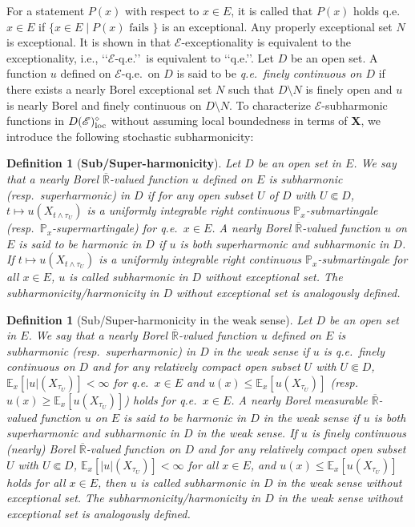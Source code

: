 \documentclass[12pt,a4paper]{article}
\newtheorem{defn}[thm]{Definition}
\newcommand{\R}{\mathbb{R}}
\newcommand{\loc}{{\rm loc}}
\newcommand{\1}{{\bf 1}}
\begin{document}
For a statement $P(x)$ with respect to $x\in E$, it is called that $P(x)$ holds q.e.~$x\in E$ if $\{x\in E\mid P(x)\text{ fails }\}$ is an exceptional. 
Any properly exceptional set $N$ is exceptional. 
It is shown in \cite[Chapter IV, Theorem~5.29(i)]{MR} that $\mathscr{E}$-exceptionality is 
equivalent to the exceptionality, i.e., \lq\lq$\mathscr{E}$-q.e.\rq\rq\, is 
equivalent to \lq\lq q.e.\rq\rq.  Let $D$ be an open set.           
A function $u$ defined on $\mathscr{E}$-q.e.~on $D$ is said to be {\it q.e.~finely continuous on $D$} if there exists a nearly Borel exceptional set 
$N$ such that $D\setminus N$ is finely open and $u$ is nearly Borel and finely continuous on $D\setminus N$.   
To characterize $\mathscr{E}$-subharmonic functions in $D(\mathscr{E})_{\loc}^{\diamond}$ without assuming local boundedness in terms of {\bf X}, we introduce 
the following stochastic subharmonicity: 
\begin{defn}[{{\bf Sub/Super-harmonicity}}]
\label{df:stochasticsubharmonicity}
{\rm Let $D$ be an open set in $E$. We say that a nearly Borel
$\overline{\R}$-valued function $u$ defined on $E$ is
\emph{subharmonic {\rm(}resp.~superharmonic{\rm)} in $D$} if 
for any open subset $U$ of $D$ with $U\Subset D$, $t\mapsto u(X_{t\wedge\tau_U})$ is a uniformly integrable right continuous $\mathbb{P}_x$-submartingale (resp.~$\mathbb{P}_x$-supermartingale) for q.e.~$x\in E$. A nearly Borel $\overline{\R}$-valued function $u$ on $E$ is said to be
\emph{harmonic in $D$} if $u$ is  both superharmonic and subharmonic in $D$.
If $t\mapsto u(X_{t\wedge\tau_U})$ is a uniformly integrable right
continuous $\mathbb{P}_x$-submartingale for all $x\in E$, $u$ is called \emph{subharmonic in $D$ without exceptional set}. 
The \emph{subharmonicity/harmonicity in $D$ without exceptional set} is
analogously defined.
}
\end{defn}

\begin{defn}[Sub/Super-harmonicity in the weak sense]
{\rm Let $D$ be an open set in $E$. We say that a nearly Borel
$\overline{\R}$-valued function $u$ defined on $E$ is \emph{subharmonic {\rm(}resp.~superharmonic{\rm)} in $D$ in the weak sense} if $u$ is q.e.~finely continuous on $D$ and for any relatively compact open subset $U$ with $U\Subset D$, $\mathbb{E}_x[|{u}|(X_{\tau_U})]<\infty$ for q.e.~$x\in E$ and ${u}(x)\leq\mathbb{E}_x[{u}(X_{\tau_U})]$ (resp.~${u}(x)\geq\mathbb{E}_x[{u}(X_{\tau_U})]$) holds for q.e.~$x\in E$.
A nearly Borel measurable $\overline{\R}$-valued function $u$ on $E$ is said to be \emph{harmonic in $D$ in the weak sense} if $u$ is both superharmonic and subharmonic in $D$ in the weak sense.
If $u$ is finely continuous (nearly) Borel $\overline{\R}$-valued function on $D$ and for any relatively compact open subset $U$ with $U\Subset D$, $\mathbb{E}_x[|{u}|(X_{\tau_U})]<\infty$ for all $x\in E$, and ${u}(x)\leq\mathbb{E}_x[{u}(X_{\tau_U})]$ holds  for all $x\in E$, then $u$ is called \emph{subharmonic in $D$ in the weak sense without exceptional set}.
The \emph{subharmonicity/harmonicity in $D$ in the weak sense without exceptional set} is analogously defined.
}
\end{defn}  
\end{document}
